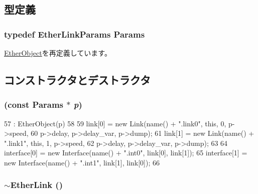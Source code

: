 \subsection{型定義}
\hypertarget{classEtherLink_ae2a807ee6467a63dfb496f847857b7df}{
\subsubsection[{Params}]{\setlength{\rightskip}{0pt plus 5cm}typedef EtherLinkParams {\bf Params}}}
\label{classEtherLink_ae2a807ee6467a63dfb496f847857b7df}


\hyperlink{classEtherObject_a47be5a25ff75cbf22f60f87dde950e13}{EtherObject}を再定義しています。

\subsection{コンストラクタとデストラクタ}
\hypertarget{classEtherLink_aff68549aceac9fb85c892f8c57b5b0cb}{
\subsubsection[{EtherLink}]{ (const {\bf Params} $\ast$ {\em p})}}
\label{classEtherLink_aff68549aceac9fb85c892f8c57b5b0cb}



\begin{DoxyCode}
57     : EtherObject(p)
58 {
59     link[0] = new Link(name() + ".link0", this, 0, p->speed,
60                        p->delay, p->delay_var, p->dump);
61     link[1] = new Link(name() + ".link1", this, 1, p->speed,
62                        p->delay, p->delay_var, p->dump);
63 
64     interface[0] = new Interface(name() + ".int0", link[0], link[1]);
65     interface[1] = new Interface(name() + ".int1", link[1], link[0]);
66 }
\end{DoxyCode}
\hypertarget{classEtherLink_a4e767b432033b81f3bd4352f8c9b046e}{
\subsubsection[{$\sim$EtherLink}]{\setlength{\rightskip}{0pt plus 5cm}$\sim${\bf EtherLink} ()}}
\label{classEtherLink_a4e767b432033b81f3bd4352f8c9b046e}



